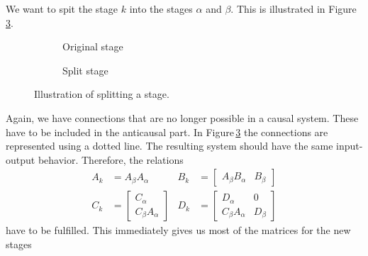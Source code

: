 \documentclass[doctype=mastersthesis,BCOR=15mm,biblatex]{ldvbook}%
\begin{document}
We want to spit the stage $k$ into the stages $\alpha$ and $\beta$.
This is illustrated in Figure\,\ref{fig:split_up}.
\begin{figure}[!htb]
	\centering
	
	\begin{subfigure}[b]{0.45\textwidth}
		\caption{Original stage}
		\label{fig:move_split_a}
	\end{subfigure}
	\hspace{0.8cm}
	\begin{subfigure}[b]{0.45\textwidth}
		\caption{Split stage}
		\label{fig:move_split_b}
	\end{subfigure}
	\caption{Illustration of splitting a stage.}
	\label{fig:split_up}
\end{figure}
Again, we have connections that are no longer possible in a causal system. 
These have to be included in the anticausal part. In Figure\,\ref{fig:split_up} the connections are represented using a dotted line.
The resulting system should have the same input-output behavior. Therefore, the relations
\begin{subequations}
	\begin{align}
	A_k&=A_\beta A_\alpha & B_k&=\begin{bmatrix}A_\beta B_\alpha &
	B_\beta \end{bmatrix}\\
	C_k&=\begin{bmatrix}C_\alpha \\ C_\beta A_\alpha \end{bmatrix}&
	D_k&= \begin{bmatrix} D_\alpha & 0 \\ C_\beta A_\alpha & D_\beta \end{bmatrix}
	\end{align}\label{eq:relations}
\end{subequations}
have to be fulfilled.
This immediately gives us most of the matrices for the new stages
\end{document}
